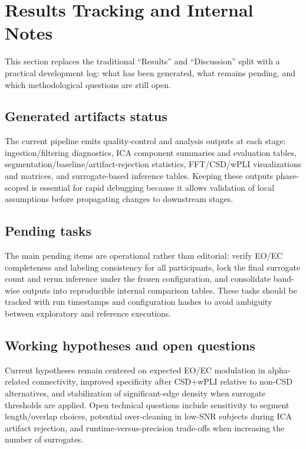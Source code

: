 \section{Results Tracking and Internal Notes}

This section replaces the traditional ``Results'' and ``Discussion'' split with a practical development log: what has been generated, what remains pending, and which methodological questions are still open.

\subsection{Generated artifacts status}

The current pipeline emits quality-control and analysis outputs at each stage: ingestion/filtering diagnostics, ICA component summaries and evaluation tables, segmentation/baseline/artifact-rejection statistics, FFT/CSD/wPLI visualizations and matrices, and surrogate-based inference tables. Keeping these outputs phase-scoped is essential for rapid debugging because it allows validation of local assumptions before propagating changes to downstream stages.

\subsection{Pending tasks}

The main pending items are operational rather than editorial: verify EO/EC completeness and labeling consistency for all participants, lock the final surrogate count and rerun inference under the frozen configuration, and consolidate band-wise outputs into reproducible internal comparison tables. These tasks should be tracked with run timestamps and configuration hashes to avoid ambiguity between exploratory and reference executions.

\subsection{Working hypotheses and open questions}

Current hypotheses remain centered on expected EO/EC modulation in alpha-related connectivity, improved specificity after CSD+wPLI relative to non-CSD alternatives, and stabilization of significant-edge density when surrogate thresholds are applied. Open technical questions include sensitivity to segment length/overlap choices, potential over-cleaning in low-SNR subjects during ICA artifact rejection, and runtime-versus-precision trade-offs when increasing the number of surrogates.
